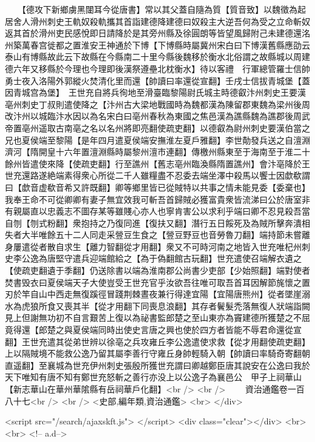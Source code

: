 　　【德攻下新鄉虜黑闥耳今從唐書】常以其父蓋自隨為質【質音致】以魏徵為起居舍人滑州刺史王軌奴殺軌攜其首詣建德降建德曰奴殺主大逆吾何為受之立命斬奴返其首於滑州吏民感悅即日請降於是其旁州縣及徐圓朗等皆望風歸附己未建德還洺州築萬春宫徙都之置淮安王神通於下博【下博縣時屬冀州宋白曰下博漢舊縣應劭云泰山有博縣故此云下故縣在今縣南二十里今縣後魏移於衡水北俗謂之故縣城以周建德六年又移縣於今理也今理即後漢祭遵壘北枕衡水】待以客禮　行軍總管羅士信帥勇士夜入洛陽外郭縱火焚清化里而還【帥讀曰率還從宣翻】壬戌士信拔青城堡【蓋因青城宫為堡】　王世充自將兵徇地至滑臺臨黎陽尉氏城主時德叡汴州刺史王要漢亳州刺史丁叔則遣使降之【汴州古大梁地戰國時為魏都漢為陳留郡東魏為梁州後周改汴州以城臨汴水因以為名宋白曰亳州春秋為東國之焦邑漢為譙縣魏為譙郡後周武帝置亳州遥取古南亳之名以名州將即亮翻使疏吏翻】以德叡為尉州刺史要漢伯當之兄也夏侯端至黎陽【是年四月遣夏侯端安撫淮左夏戶雅翻】李世勣發兵送之自澶淵濟河【隋開皇十六年置澶淵縣時屬黎州澶市連翻】傳檄州縣東至于海南至于淮二十餘州皆遣使來降【使疏吏翻】行至譙州【舊志亳州臨渙縣隋置譙州】會汴亳降於王世充還路遂絶端素得衆心所從二千人雖糧盡不忍委去端坐澤中殺馬以饗士因歔欷謂曰【歔音虚欷音希又許既翻】卿等鄉里皆已從賊特以共事之情未能見委【委棄也】我奉王命不可從卿卿有妻子無宜效我可斬吾首歸賊必獲富貴衆皆流涕曰公於唐室非有親屬直以忠義志不圖存某等雖賤心亦人也寧肯害公以求利乎端曰卿不忍見殺吾當自刎【刎式粉翻】衆抱持之乃復同進【復扶又翻】潛行五日餒死及為賊所擊奔潰相失者大半唯餘五十二人同走采䝁豆生食之【䝁豆野豆也音勞魯刀翻】端持節未嘗離身屢遣從者散自求生【離力智翻從才用翻】衆又不可時河南之地皆入世充唯杞州刺史李公逸為唐堅守遣兵迎端館給之【為于偽翻館古玩翻】世充遣使召端解衣遺之【使疏吏翻遺于季翻】仍送除書以端為淮南郡公尚書少吏部【少始照翻】端對使者焚書毁衣曰夏侯端天子大使豈受王世充官乎汝欲吾往唯可取吾首耳因解節旄懷之置刃於竿自山中西走無復蹊徑冒踐荆棘晝夜兼行得達宜陽【宜陽唐熊州】從者墜崖溺水為虎狼所食又喪其半【從才用翻下同喪息浪翻】其存者鬢髮禿落無復人狀端詣闕見上但謝無功初不自言艱苦上復以為祕書監郎楚之至山東亦為竇建德所獲楚之不屈竟得還【郎楚之與夏侯端同時出使史言唐之興也使於四方者皆能不辱君命還從宣翻】王世充遣其從弟世辨以徐亳之兵攻雍丘李公逸遣使求救【從才用翻使疏吏翻】上以隔賊境不能救公逸乃留其屬李善行守雍丘身帥輕騎入朝【帥讀曰率騎奇寄翻朝直遥翻】至襄城為世充伊州刺史張殷所獲世充謂曰卿越鄭臣唐其說安在公逸曰我於天下唯知有唐不知有鄭世充怒斬之善行亦没上以公逸子為襄邑公　甲子上祠華山【新志華山在華州華隂縣有岳祠華戶化翻】<br />
<br />
　　資治通鑑卷一百八十七<br />
<br />
<史部,編年類,資治通鑑>  <br>
   </div> 

<script src="/search/ajaxskft.js"> </script>
 <div class="clear"></div>
<br>
<br>
 <!-- a.d-->

